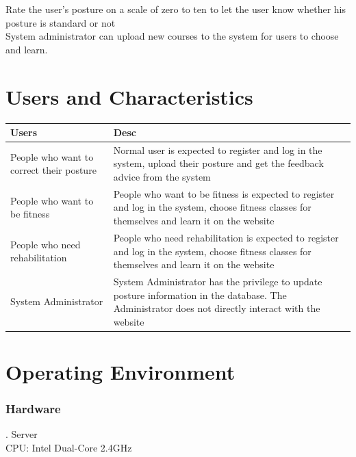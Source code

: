 \documentclass[16pt]{scrreprt}
\begin{document}
Rate the user's posture on a scale of zero to ten to let the user know whether his posture is standard or not\\


System administrator can upload new courses to the system for users to choose and learn.\\

\section{Users and Characteristics}

 
\begin{center}
    \begin{tabular}{p{5cm}p{11cm}}
        \hline
	    Users & Desc\\
        \hline
	    People who want to correct their posture &  Normal user is expected to register and log in the system, upload their posture and get the feedback advice from the system\\
        \hline
	    People who want to be fitness & People who want to be fitness is expected to register and log in the system, choose fitness classes for themselves and learn it on the website\\
        \hline
        People who need rehabilitation & People who need rehabilitation is expected to register and log in the system, choose fitness classes for themselves and learn it on the website\\
        \hline
        System Administrator & System Administrator has the privilege to update posture information in the database. The Administrator does not directly interact with the website\\
        \hline
    \end{tabular}
\end{center}

 
\section{Operating Environment}

 
\subsubsection{Hardware}

 
. Server\\

 
CPU: Intel Dual-Core 2.4GHz\\
\end{document}
